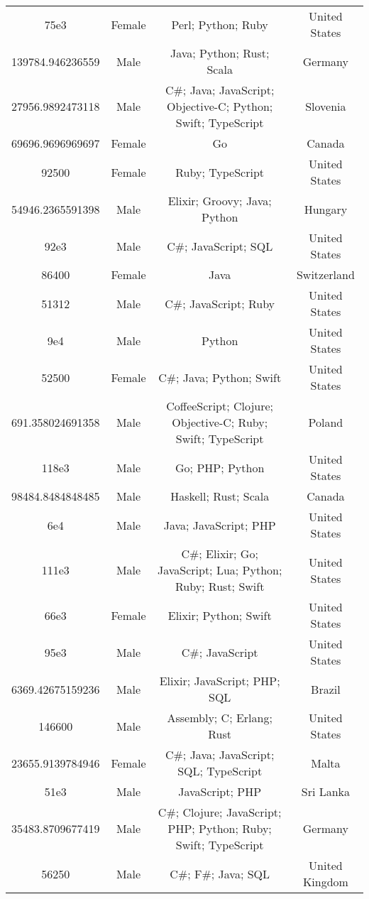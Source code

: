 \begin{center}
\begin{tabular}{ |c|c|c|c| }
75e3  &  Female  &  Perl; Python; Ruby  &  United States  \\ 
139784.946236559  &  Male  &  Java; Python; Rust; Scala  &  Germany  \\ 
27956.9892473118  &  Male  &  C\#; Java; JavaScript; Objective-C; Python; Swift; TypeScript  &  Slovenia  \\ 
69696.9696969697  &  Female  &  Go  &  Canada  \\ 
92500  &  Female  &  Ruby; TypeScript  &  United States  \\ 
54946.2365591398  &  Male  &  Elixir; Groovy; Java; Python  &  Hungary  \\ 
92e3  &  Male  &  C\#; JavaScript; SQL  &  United States  \\ 
86400  &  Female  &  Java  &  Switzerland  \\ 
51312  &  Male  &  C\#; JavaScript; Ruby  &  United States  \\ 
9e4  &  Male  &  Python  &  United States  \\ 
52500  &  Female  &  C\#; Java; Python; Swift  &  United States  \\ 
691.358024691358  &  Male  &  CoffeeScript; Clojure; Objective-C; Ruby; Swift; TypeScript  &  Poland  \\ 
118e3  &  Male  &  Go; PHP; Python  &  United States  \\ 
98484.8484848485  &  Male  &  Haskell; Rust; Scala  &  Canada  \\ 
6e4  &  Male  &  Java; JavaScript; PHP  &  United States  \\ 
111e3  &  Male  &  C\#; Elixir; Go; JavaScript; Lua; Python; Ruby; Rust; Swift  &  United States  \\ 
66e3  &  Female  &  Elixir; Python; Swift  &  United States  \\ 
95e3  &  Male  &  C\#; JavaScript  &  United States  \\ 
6369.42675159236  &  Male  &  Elixir; JavaScript; PHP; SQL  &  Brazil  \\ 
146600  &  Male  &  Assembly; C; Erlang; Rust  &  United States  \\ 
23655.9139784946  &  Female  &  C\#; Java; JavaScript; SQL; TypeScript  &  Malta  \\ 
51e3  &  Male  &  JavaScript; PHP  &  Sri Lanka  \\ 
35483.8709677419  &  Male  &  C\#; Clojure; JavaScript; PHP; Python; Ruby; Swift; TypeScript  &  Germany  \\ 
56250  &  Male  &  C\#; F\#; Java; SQL  &  United Kingdom  \\ 

\end{tabular}
\end{center}
